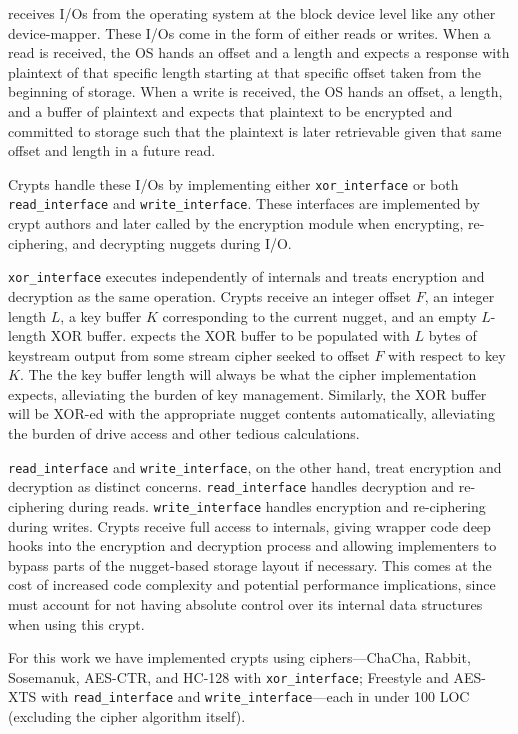\sys receives I/Os from the operating system at the block device level like any
other device-mapper. These I/Os come in the form of either reads or writes. When
a read is received, the OS hands \sys an offset and a length and expects a
response with plaintext of that specific length starting at that specific offset
taken from the beginning of storage. When a write is received, the OS hands \sys
an offset, a length, and a buffer of plaintext and expects that plaintext to be
encrypted and committed to storage such that the plaintext is later retrievable
given that same offset and length in a future read.

Crypts handle these I/Os by implementing either \texttt{xor\_interface} or both
\texttt{read\_interface} and \texttt{write\_interface}. These interfaces are
implemented by crypt authors and later called by the encryption module when
encrypting, re-ciphering, and decrypting nuggets during I/O.


\texttt{xor\_interface} executes independently of \sys internals and treats
encryption and decryption as the same operation. Crypts receive an integer
offset $F$, an integer length $L$, a key buffer $K$ corresponding to the current
nugget, and an empty $L$-length XOR buffer. \sys expects the XOR buffer to be
populated with $L$ bytes of keystream output from some stream cipher seeked to
offset $F$ with respect to key $K$. The the key buffer length will always be
what the cipher implementation expects, alleviating the burden of key
management. Similarly, the XOR buffer will be XOR-ed with the appropriate nugget
contents automatically, alleviating the burden of drive access and other tedious
calculations.


\texttt{read\_interface} and \texttt{write\_interface}, on the other hand, treat
encryption and decryption as distinct concerns. \texttt{read\_interface} handles
decryption and re-ciphering during reads. \texttt{write\_interface} handles
encryption and re-ciphering during writes. Crypts receive full access to \sys
internals, giving wrapper code deep hooks into the encryption and decryption
process and allowing implementers to bypass parts of the nugget-based storage
layout if necessary. This comes at the cost of increased code complexity and
potential performance implications, since \sys must account for not having
absolute control over its internal data structures when using this crypt.

For this work we have implemented \numConfigs crypts using \numCiphers
ciphers---ChaCha, Rabbit, Sosemanuk, AES-CTR, and HC-128 with
\texttt{xor\_interface}; Freestyle and AES-XTS with \texttt{read\_interface} and
\texttt{write\_interface}---each in under 100 LOC (excluding the cipher
algorithm itself).

